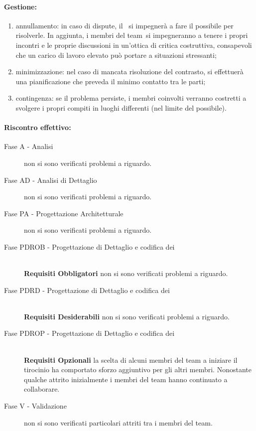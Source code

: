 \documentclass[../PianoProgetto.tex]{subfiles}
\begin{document}
	\paragraph*{Gestione:}
	\begin{enumerate}
		\item annullamento: in caso di dispute, il \responsabilediprogetto\ si impegnerà a fare il possibile per risolverle. In aggiunta, i membri del team\g\ si impegneranno a tenere i propri incontri e le proprie discussioni in un'ottica di critica costruttiva, consapevoli che un carico di lavoro elevato può portare a situazioni stressanti;
		\item minimizzazione: nel caso di mancata risoluzione del contrasto, si effettuerà una pianificazione che preveda il minimo contatto tra le parti; 
		\item contingenza: se il problema persiste, i membri coinvolti verranno costretti a svolgere i propri compiti in luoghi differenti (nel limite del possibile).
	\end{enumerate}	
	
	
	\paragraph*{Riscontro effettivo:}
		\begin{description}
			\item[Fase A - Analisi] non si sono verificati problemi a riguardo.
			\item[Fase AD - Analisi di Dettaglio] non si sono verificati problemi a riguardo.
			\item[Fase PA - Progettazione Architetturale] non si sono verificati problemi a riguardo.
			\item[Fase PDROB - Progettazione di Dettaglio e codifica dei]  \ \\
					\textbf{Requisiti Obbligatori} non si sono verificati problemi a riguardo.
			\item[Fase PDRD - Progettazione di Dettaglio e codifica dei] \ \\
					\textbf{Requisiti Desiderabili} non si sono verificati problemi a riguardo.
			\item[Fase PDROP - Progettazione di Dettaglio e codifica dei]  \ \\
					\textbf{Requisiti Opzionali} la scelta di alcuni membri del team a iniziare il tirocinio ha comportato sforzo aggiuntivo per gli altri membri. Nonostante qualche attrito inizialmente i membri del team hanno continuato a collaborare.
			\item[Fase V - Validazione] non si sono verificati particolari attriti tra i membri del team.
		\end{description}
\end{document}
